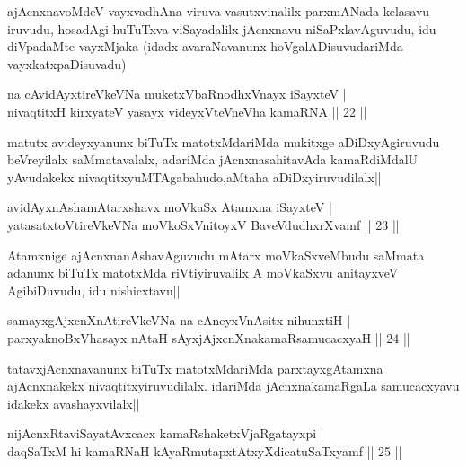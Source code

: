 \begin{artha}
ajAcnxnavoMdeV vayxvadhAna viruva vasutxvinalilx parxmANada kelasavu iruvudu, hosadAgi huTuTxva viSayadalilx jAcnxnavu niSaPxlavAguvudu, idu diVpadaMte vayxMjaka (idadx avaraNavanunx hoVgalADisuvudariMda vayxkatxpaDisuvadu)
\end{artha}


\begin{shl}
na cAvidAyxtireVkeVNa muketxVbaRnodhxV\s nayx iSayxteV |\\
nivaqtitxH kirxyateV yasayx videyxVteVneVha kamaRNA \hfill || 22 ||
\end{shl}

\begin{artha}
matutx avideyxyanunx biTuTx matotxMdariMda mukitxge aDiDxyAgiruvudu beVreyilalx saMmatavalalx, adariMda jAcnxnasahitavAda kamaRdiMdalU yAvudakekx nivaqtitxyuMTAgabahudo,aMtaha aDiDxyiruvudilalx||
\end{artha}

\begin{shl}
avidAyxnAshamAtarxshavx moVkaSx Atamxna iSayxteV |\\
yatasatxtoV\s tireVkeVNa moVkoSxV\s nitoyxV BaveVdudhxrXvamf \hfill || 23 ||
\end{shl}

\begin{artha}
Atamxnige ajAcnxnanAshavAguvudu mAtarx moVkaSxveMbudu saMmata adanunx biTuTx matotxMda riVtiyiruvalilx A moVkaSxvu anitayxveV AgibiDuvudu, idu nishicxtavu||
\end{artha}

\begin{shl}
samayxgAjxcnXnAtireVkeVNa na cAneyxVnAsitx nihunxtiH |\\
parxyaknoBxVhasayx nAtaH sAyxjAjxcnXnakamaRsamucacxyaH \hfill || 24 ||
\end{shl}

\begin{artha}
tatavxjAcnxnavanunx biTuTx matotxMdariMda parxtayxgAtamxna ajAcnxnakekx nivaqtitxyiruvudilalx. idariMda jAcnxnakamaRgaLa samucacxyavu idakekx avashayxvilalx||
\end{artha}

\begin{shl}
nijAcnxRtaviSayatAvxcacx kamaRshaketxVjaRgatayxpi |\\
daqSaTxM hi kamaRNaH kAyaRmutapxtAtxyXdicatuSaTxyamf \hfill || 25 ||
\end{shl}

